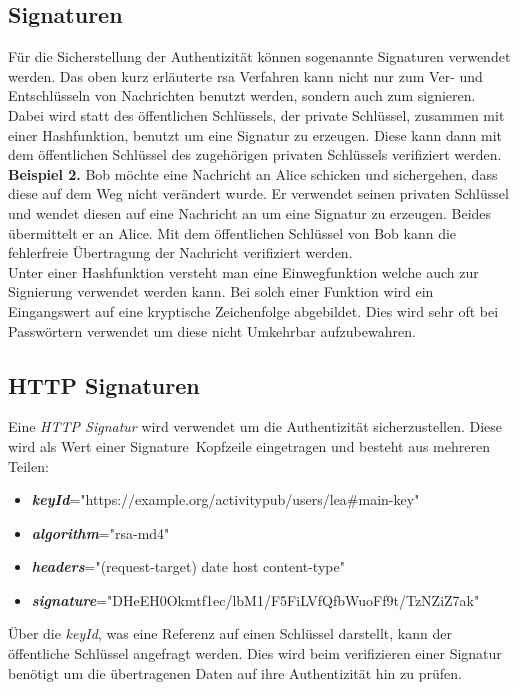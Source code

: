 	\subsection{Signaturen}
	Für die Sicherstellung der Authentizität können sogenannte Signaturen verwendet werden. Das oben kurz erläuterte \gls{rsa} Verfahren kann nicht nur zum Ver- und Entschlüsseln von Nachrichten benutzt werden, sondern auch zum signieren. Dabei wird statt des öffentlichen Schlüssels, der private Schlüssel, zusammen mit einer Hashfunktion, benutzt um eine Signatur zu erzeugen. Diese kann dann mit dem öffentlichen Schlüssel des zugehörigen privaten Schlüssels verifiziert werden.\\
	
	\textbf{Beispiel 2.} Bob möchte eine Nachricht an Alice schicken und sichergehen, dass diese auf dem Weg nicht verändert wurde. Er verwendet seinen privaten Schlüssel und wendet diesen auf eine Nachricht an um eine Signatur zu erzeugen. Beides übermittelt er an Alice. Mit dem öffentlichen Schlüssel von Bob kann die fehlerfreie Übertragung der Nachricht verifiziert werden.\\
	
	Unter einer Hashfunktion versteht man eine Einwegfunktion welche auch zur Signierung verwendet werden kann. Bei solch einer Funktion wird ein Eingangswert auf eine kryptische Zeichenfolge abgebildet. Dies wird sehr oft bei Passwörtern verwendet um diese nicht Umkehrbar aufzubewahren.\\
	\subsection{HTTP Signaturen}
	\label{subsec:http-signaturen}
	Eine \textit{HTTP Signatur} wird verwendet um die Authentizität sicherzustellen. Diese wird als Wert einer \glqq Signature\grqq~Kopfzeile eingetragen und besteht aus mehreren Teilen:
	\begin{itemize}
		\item \textit{\textbf{keyId}}="https://example.org/activitypub/users/lea\#main-key"
		\item \textit{\textbf{algorithm}}="rsa-md4"
		\item \textit{\textbf{headers}}="(request-target) date host content-type"
		\item \textit{\textbf{signature}}="DHeEH0Okmtf1ec/lbM1/F5FiLVfQfbWuoFf9t/TzNZiZ7ak"
	\end{itemize}
	Über die \textit{keyId}, was eine Referenz auf einen Schlüssel darstellt, kann der öffentliche Schlüssel angefragt werden. Dies wird beim verifizieren einer Signatur benötigt um die übertragenen Daten auf ihre Authentizität hin zu prüfen.\\
	

